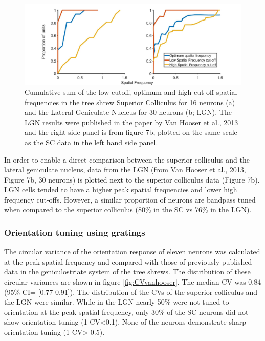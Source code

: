 	\begin{figure}[]
		\includegraphics[width=\linewidth]{superiorcolliculus/cumsum_sf_SC_LGN.jpg}
		\caption{ Cumulative sum of the low-cutoff, optimum and high cut off spatial frequencies in the tree shrew Superior Colliculus for 16 neurons (a) and the Lateral Geniculate Nucleus for 30 neurons (b; LGN). The LGN results were published in the paper by Van Hooser et al., 2013 and the right side panel is from figure 7b, plotted on the same scale as the SC data in the left hand side panel.}
		\label{fig:sfcumdist}			
	\end{figure}
	
	In order to enable a direct comparison between the superior colliculus and the lateral geniculate nucleus, data from the LGN (from Van Hooser et al., 2013, Figure 7b, 30 neurons) is plotted next to the superior colliculus data (Figure 7b). LGN cells tended to have a higher peak spatial frequencies and lower high frequency cut-offs. However, a similar proportion of neurons are bandpass tuned when compared to the superior colliculus (80\% in the SC vs 76\% in the LGN).
	
	\subsubsection{Orientation tuning using gratings}
	
	The circular variance of the orientation response of eleven neurons was calculated at the peak spatial frequency and compared with those of previously published data in the geniculostriate system of the tree shrews. The distribution of these circular variances are shown in figure \ref{fig:CVvanhooser}. The median CV was 0.84 (95\% CI= [0.77 0.91]). The distribution of the CVs of the superior colliculus and the LGN were similar. While in the LGN nearly 50\% were not tuned to orientation at the peak spatial frequency, only 30\% of the SC neurons did not show orientation tuning (1-CV<0.1). None of the neurons demonstrate sharp orientation tuning (1-CV> 0.5). 
		
